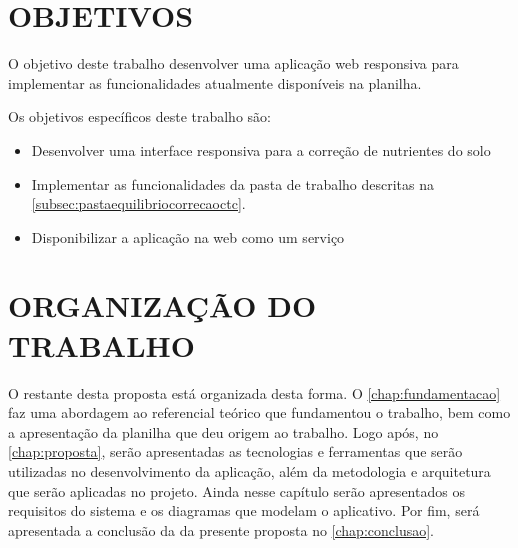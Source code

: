 \section{OBJETIVOS}
\label{sec:objetivos}


O objetivo deste trabalho desenvolver uma aplicação web responsiva para implementar as funcionalidades atualmente disponíveis na planilha.

Os objetivos específicos deste trabalho são:

\begin{itemize}
    \item Desenvolver uma interface responsiva para a correção de nutrientes do solo
    
    \item Implementar as funcionalidades da pasta de trabalho descritas na  \autoref{subsec:pastaequilibriocorrecaoctc}.
    
    
    
    \item Disponibilizar a aplicação na web como um serviço
\end{itemize}

\section{ORGANIZAÇÃO DO TRABALHO}
\label{sec:organizacaoTrabalho}

O restante desta proposta está organizada desta forma. O \autoref{chap:fundamentacao} faz uma abordagem ao referencial teórico que fundamentou o trabalho, bem como a apresentação da planilha que deu origem ao trabalho. Logo após, no \autoref{chap:proposta}, serão apresentadas as tecnologias e ferramentas que serão utilizadas no desenvolvimento da aplicação, além da metodologia e arquitetura que serão aplicadas no projeto. Ainda nesse capítulo serão apresentados os requisitos do sistema e os diagramas que modelam o aplicativo. Por fim, será apresentada a conclusão da da presente proposta no \autoref{chap:conclusao}.
